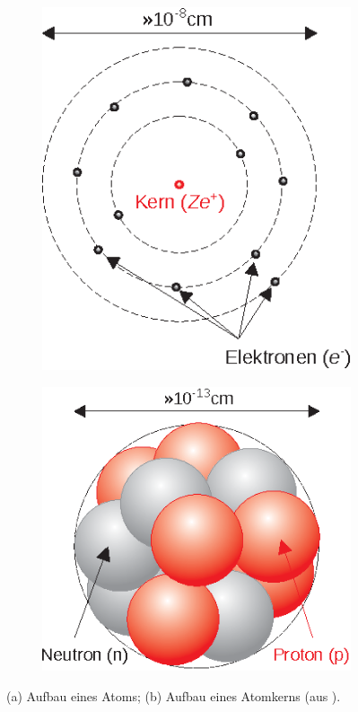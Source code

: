 \begin{figure}[tb]
	\centering
	
	\begin{subfigure}[b]{0.3\textwidth}
		\includegraphics[width=\textwidth]{fig/i_01_atom.eps}
		\caption{}
		\label{fig:i_01_atom}
	\end{subfigure}
	\qquad\qquad\qquad\qquad
	\begin{subfigure}[b]{0.3\textwidth}
		\includegraphics[width=\textwidth]{fig/i_02_kern.eps}
		\caption{}
		\label{fig:i_01_kern}
	\end{subfigure}
	
	\caption{(a) Aufbau eines Atoms; (b) Aufbau eines Atomkerns (aus \cite[S. 507]{EKS07}).}
\end{figure}

